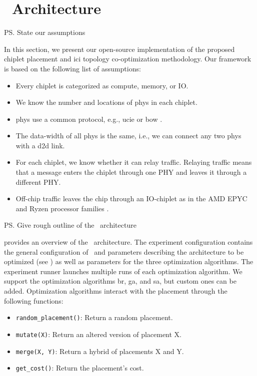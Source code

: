 \section{\name~Architecture}
\label{sec:arch}

\ps{State our assumptions}

In this section, we present our open-source implementation of the proposed chiplet placement and \gls{ici} topology co-optimization methodology.
Our framework is based on the following list of assumptions:

\begin{itemize}
	\item Every chiplet is categorized as compute, memory, or IO.
	\item We know the number and locations of \gls{phys} in each chiplet.
	\item \gls{phys} use a common protocol, e.g., \gls{ucie} \cite{ucie} or \gls{bow} \cite{bow}.
	\item The data-width of all \gls{phys} is the same, i.e., we can connect any two \gls{phys} with a \gls{d2d} link.
	\item For each chiplet, we know whether it can relay traffic. Relaying traffic means that a message enters the chiplet through one PHY and leaves it through a different PHY.
	\item Off-chip traffic leaves the chip through an IO-chiplet as in the AMD EPYC and Ryzen processor families \cite{amd-chiplet}.
\end{itemize}

\ps{Give rough outline of the \name~architecture}

 provides an overview of the \name~architecture. 
The experiment configuration contains the general configuration of \name~and parameters describing the architecture to be optimized (see ) as well as parameters for the three optimization algorithms.
The experiment runner launches multiple runs of each optimization algorithm.
We support the optimization algorithms \acrfull{br}, \acrfull{ga}, and \acrfull{sa}, but custom ones can be added.
Optimization algorithms interact with the placement through the following functions:

\begin{itemize}
	\item	\texttt{random\_placement()}: Return a random placement.
	\item	\texttt{mutate(X)}: Return an altered version of placement X.
	\item	\texttt{merge(X, Y)}: Return a hybrid of placements X and Y.
	\item	\texttt{get\_cost()}: Return the placement's cost.
\end{itemize}

